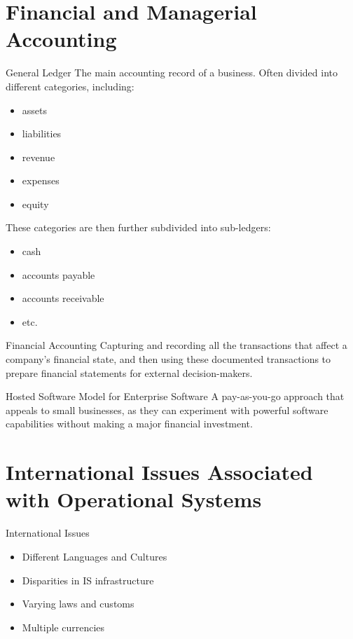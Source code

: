 \documentclass[\main/notes.tex]{subfiles}
\begin{document}
		\pagebreak
		\section{Financial and Managerial Accounting}
			\begin{definition}{General Ledger}
				The main accounting record of a business. Often divided into different categories, including:
				\begin{multicols}{2}
					\begin{itemize}[nosep]
						\item assets
						\item liabilities
						\item revenue
						\item expenses
						\item equity
					\end{itemize}
				\end{multicols}
				These categories are then further subdivided into sub-ledgers:
				\begin{multicols}{2}
					\begin{itemize}[nosep]
						\item cash
						\item accounts payable
						\item accounts receivable
						\item etc.
					\end{itemize}
				\end{multicols}
			\end{definition}
			\begin{definition}{Financial Accounting}
				Capturing and recording all the transactions that affect a company's financial state, and then using these documented transactions to prepare financial statements for external decision-makers.
			\end{definition}
			\begin{sidenote}{Hosted Software Model for Enterprise Software}
				A pay-as-you-go approach that appeals to small businesses, as they can experiment with powerful software capabilities without making a major financial investment.
			\end{sidenote}

		\section{International Issues Associated with Operational Systems}
			\begin{sidenote}{International Issues}
				\begin{itemize}
					\item Different Languages and Cultures
					\item Disparities in IS infrastructure
					\item Varying laws and customs
					\item Multiple currencies
				\end{itemize}
			\end{sidenote}
	\vbox{}
\end{document}
